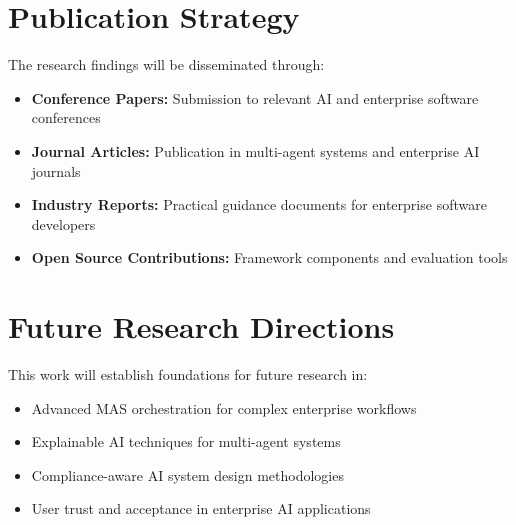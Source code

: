 \section{Publication Strategy}

The research findings will be disseminated through:
\begin{itemize}
    \item \textbf{Conference Papers:} Submission to relevant AI and enterprise software conferences
    \item \textbf{Journal Articles:} Publication in multi-agent systems and enterprise AI journals
    \item \textbf{Industry Reports:} Practical guidance documents for enterprise software developers
    \item \textbf{Open Source Contributions:} Framework components and evaluation tools
\end{itemize}

\section{Future Research Directions}

This work will establish foundations for future research in:
\begin{itemize}
    \item Advanced MAS orchestration for complex enterprise workflows
    \item Explainable AI techniques for multi-agent systems
    \item Compliance-aware AI system design methodologies
    \item User trust and acceptance in enterprise AI applications
\end{itemize}
